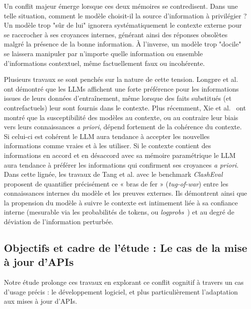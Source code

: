 \documentclass[11pt, a4paper]{article}
\begin{document}
Un conflit majeur émerge lorsque ces deux mémoires se contredisent. Dans une telle situation, comment le modèle choisit-il la source d'information à privilégier ? Un modèle trop "sûr de lui" ignorera systématiquement le contexte externe pour se raccrocher à ses croyances internes, générant ainsi des réponses obsolètes malgré la présence de la bonne information. À l'inverse, un modèle trop "docile" se laissera manipuler par n'importe quelle information ou ensemble d'informations contextuel, même factuellement faux ou incohérente. 

Plusieurs travaux se sont penchés sur la nature de cette tension. Longpre et al.~\cite{longpre2021paramvscontext} ont démontré que les LLMs affichent une forte préférence pour les informations issues de leurs données d'entraînement, même lorsque des faits substitués (et contrefactuels) leur sont fournis dans le contexte. Plus récemment, Xie et al.~\cite{xie2023} ont montré que la susceptibilité des modèles au contexte, ou au contraire leur biais vers leurs connaissances \textit{a priori}, dépend fortement de la cohérence du contexte. Si celui-ci est cohérent le LLM aura tendance à accepter les nouvelles informations comme vraies et à les utiliser. Si le contexte contient des informations en accord et en désaccord avec sa mémoire paramétrique le LLM aura tendance à préférer les informations qui confirment ses croyances \textit{a priori}.  Dans cette lignée, les travaux de Tang et al. avec le benchmark \textit{ClashEval}~\cite{clasheval2024} proposent de quantifier précisément ce « bras de fer » (\textit{tug-of-war}) entre les connaissances internes du modèle et les preuves externes.
Ils démontrent ainsi que la propension du modèle à suivre le contexte est intimement liée à sa confiance interne (mesurable via les probabilités de tokens, ou \textit{logprobs}~\cite{mitchell2023, zhao2024}) et au degré de déviation de l'information perturbée. 






\subsection{Objectifs et cadre de l'étude : Le cas de la mise à jour d'APIs}

Notre étude prolonge ces travaux en explorant ce conflit cognitif à travers un cas d'usage précis : le développement logiciel, et plus particulièrement l'adaptation aux mises à jour d'APIs. 
\end{document}
